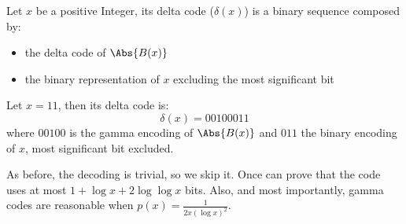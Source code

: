 \documentclass{subfiles}
\begin{document}
    Let \(x\) be a positive Integer, 
        its delta code (\(\delta(x)\)) is a binary sequence composed by:
        \begin{itemize}
            \item the delta code of \(\Abs{B(x)}\)
            \item the binary representation of \(x\) excluding the most significant bit
        \end{itemize}

    \begin{example*}
        Let \(x = 11\), then its delta code is:
            \[
                \delta(x) = 001 00 011
            \]
        where \(00100\) is the gamma encoding of \(\Abs{B(x)}\) and 
            \(011\) the binary encoding of \(x\), most significant bit excluded.
    \end{example*}
    
    As before, the decoding is trivial, so we skip it.
    Once can prove that the code uses at most \(1 + \log x + 2 \log \log x\) bits.
    Also, and most importantly,
        gamma codes are reasonable when \(p(x) = \tfrac{1}{2x (\log x)^{2}}\).
\end{document}
